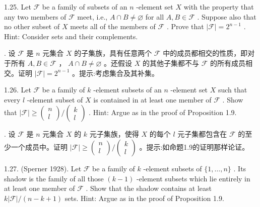 \documentclass[10pt]{article}
\begin{document}
1.25. Let \(\mathcal{F}\) be a family of subsets of an \(n\) -element set \(X\) with the property that any two members of \(\mathcal{F}\) meet, i.e., \(A \cap  B \neq  \varnothing\) for all \(A,B \in  \mathcal{F}\) . Suppose also that no other subset of \(X\) meets all of the members of \(\mathcal{F}\) . Prove that \(\left| \mathcal{F}\right|  = {2}^{n - 1}\) . Hint: Consider sets and their complements.

\begin{tcolorbox}. 设 \(\mathcal{F}\) 是 \(n\) 元集合 \(X\) 的子集族，具有任意两个 \(\mathcal{F}\) 中的成员都相交的性质，即对于所有 \(A,B \in  \mathcal{F}\) ， \(A \cap  B \neq  \varnothing\) 。还假设 \(X\) 的其他子集都不与 \(\mathcal{F}\) 的所有成员相交。证明 \(\left| \mathcal{F}\right|  = {2}^{n - 1}\) 。提示:考虑集合及其补集。
\end{tcolorbox}

1.26. Let \(\mathcal{F}\) be a family of \(k\) -element subsets of an \(n\) -element set \(X\) such that every \(l\) -element subset of \(X\) is contained in at least one member of \(\mathcal{F}\) . Show that \(\left| \mathcal{F}\right|  \geq  \left( \begin{matrix} n \\  l \end{matrix}\right) /\left( \begin{matrix} k \\  l \end{matrix}\right)\) . Hint: Argue as in the proof of Proposition 1.9.

\begin{tcolorbox}. 设 \(\mathcal{F}\) 是 \(n\) 元集合 \(X\) 的 \(k\) 元子集族，使得 \(X\) 的每个 \(l\) 元子集都包含在 \(\mathcal{F}\) 的至少一个成员中。证明 \(\left| \mathcal{F}\right|  \geq  \left( \begin{matrix} n \\  l \end{matrix}\right) /\left( \begin{matrix} k \\  l \end{matrix}\right)\) 。提示:如命题1.9的证明那样论证。
\end{tcolorbox}

1.27. (Sperner 1928). Let \(\mathcal{F}\) be a family of \(k\) -element subsets of \(\{ 1,\ldots ,n\}\) . Its shadow is the family of all those \(\left( {k - 1}\right)\) -element subsets which lie entirely in at least one member of \(\mathcal{F}\) . Show that the shadow contains at least \(k\left| \mathcal{F}\right| /\left( {n - k + 1}\right)\) sets. Hint: Argue as in the proof of Proposition 1.9.
\end{document}
